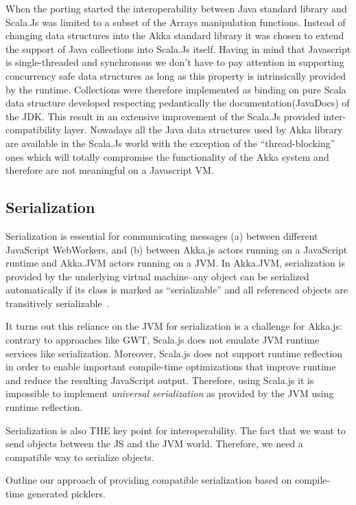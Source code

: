 \documentclass{sig-alternate}
\begin{document}
When the porting started the interoperability between Java standard library and Scala.Js was limited to a subset of the Arrays manipulation functions.
Instead of changing data structures into the Akka standard library it was chosen to extend the support of Java collections into Scala.Js itself.
Having in mind that Javascript is single-threaded and synchronous we don't have to pay attention in supporting concurrency safe data structures as long as this property is intrinsically provided by the runtime.
Collections were therefore implemented as binding on pure Scala data structure developed respecting pedantically the documentation(JavaDocs) of the JDK.
This result in an extensive improvement of the Scala.Js provided inter-compatibility layer.
Nowadays all the Java data structures used by Akka library are available in the Scala.Js world with the exception of the ``thread-blocking'' ones which will totally compromise the functionality of the Akka system and therefore are not meaningful on a Javascript VM.


\subsection{Serialization}\label{sec:serialization}

Serialization is essential for communicating messages (a) between different
JavaScript WebWorkers, and (b) between Akka.js actors running on a JavaScript
runtime and Akka.JVM actors running on a JVM. In Akka.JVM, serialization is
provided by the underlying virtual machine--any object can be serialized
automatically if its class is marked as ``serializable'' and all referenced
objects are transitively serializable~\cite{JavaSerialization}.

It turns out this reliance on the JVM for serialization is a challenge for
Akka.js: contrary to approaches like GWT, Scala.js does not emulate JVM
runtime services like serialization. Moreover, Scala.js does not support
runtime reflection in order to enable important compile-time optimizations
that improve runtime and reduce the resulting JavaScript output. Therefore,
using Scala.js it is impossible to implement {\em universal serialization} as
provided by the JVM using runtime reflection.

Serialization is also THE key point for interoperability. The fact that we
want to send objects between the JS and the JVM world. Therefore, we need a
compatible way to serialize objects.

Outline our approach of providing compatible serialization based on compile-
time generated picklers.
\end{document}
